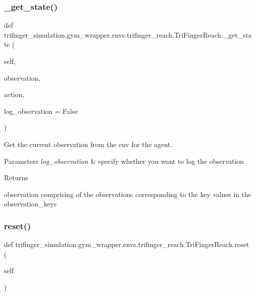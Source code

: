 \subsubsection{\texorpdfstring{\+\_\+get\+\_\+state()}{\_get\_state()}}
{\footnotesize\ttfamily def trifinger\+\_\+simulation.\+gym\+\_\+wrapper.\+envs.\+trifinger\+\_\+reach.\+Tri\+Finger\+Reach.\+\_\+get\+\_\+state (\begin{DoxyParamCaption}\item[{}]{self,  }\item[{}]{observation,  }\item[{}]{action,  }\item[{}]{log\+\_\+observation = {\ttfamily False} }\end{DoxyParamCaption})\hspace{0.3cm}{\ttfamily [private]}}



Get the current observation from the env for the agent. 


\begin{DoxyParams}{Parameters}
{\em log\+\_\+observation} & specify whether you want to log the observation\\
\hline
\end{DoxyParams}
\begin{DoxyReturn}{Returns}


observation comprising of the observations corresponding to the key values in the observation\+\_\+keys 
\end{DoxyReturn}
\mbox{\label{classtrifinger__simulation_1_1gym__wrapper_1_1envs_1_1trifinger__reach_1_1TriFingerReach_a46ae0ba9d5fc6cf4b8809db2fce2502b}} 
\subsubsection{\texorpdfstring{reset()}{reset()}}
{\footnotesize\ttfamily def trifinger\+\_\+simulation.\+gym\+\_\+wrapper.\+envs.\+trifinger\+\_\+reach.\+Tri\+Finger\+Reach.\+reset (\begin{DoxyParamCaption}\item[{}]{self }\end{DoxyParamCaption})}



